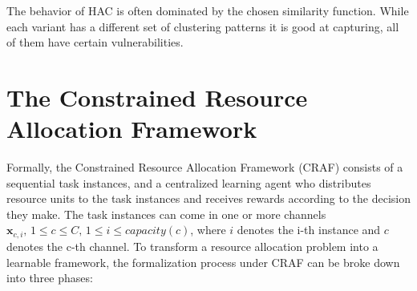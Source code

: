 \documentclass[conference]{IEEEtran}
\begin{document}
 The behavior of HAC is often dominated by the chosen similarity function. While each variant has a different set of clustering patterns it is good at capturing, all of them have certain vulnerabilities. 

%
%
%
%
%


\section{The Constrained Resource Allocation Framework}

Formally, the Constrained Resource Allocation Framework (CRAF) consists of a sequential task instances, and a centralized learning agent who distributes resource units to the task instances and receives rewards according to the decision they make. The task instances can come in one or more channels $\mathbf{x}_{c,i},\, 1\leq c \leq C,\, 1\leq i \leq capacity(c)$, where $i$ denotes the i-th instance and $c$ denotes the c-th channel. To transform a resource allocation problem into a learnable framework, the formalization process under CRAF can be broke down into three phases:
\end{document}
